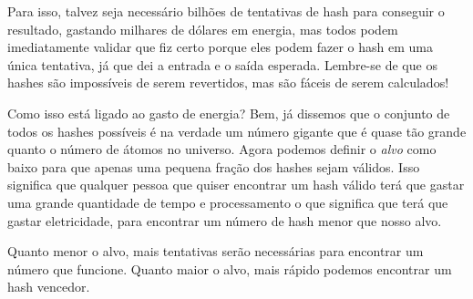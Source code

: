 Para isso, talvez seja necessário bilhões de tentativas de hash para conseguir o resultado, gastando milhares de dólares em energia, mas todos podem imediatamente validar que fiz certo porque eles podem fazer o hash em uma única tentativa, já que dei a entrada e o saída esperada. Lembre-se de que os hashes são impossíveis de serem revertidos, mas são fáceis de serem calculados!

Como isso está ligado ao gasto de energia? Bem, já dissemos que o conjunto de todos os hashes possíveis é na verdade um número gigante que é quase tão grande quanto o número de átomos no universo. Agora podemos definir o \textit{alvo} como baixo para que apenas uma pequena fração dos hashes sejam válidos. Isso significa que qualquer pessoa que quiser encontrar um hash válido terá que gastar uma grande quantidade de tempo e processamento o que significa que terá que gastar eletricidade, para encontrar um número de hash menor que nosso alvo.

Quanto menor o alvo, mais tentativas serão necessárias para encontrar um número que funcione. Quanto maior o alvo, mais rápido podemos encontrar um hash vencedor.